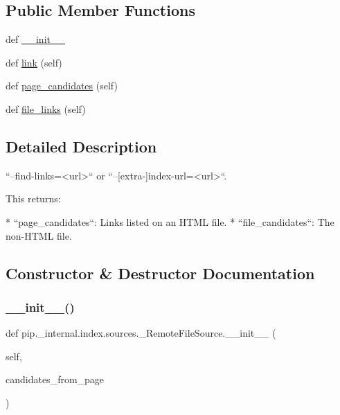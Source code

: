 \subsection*{Public Member Functions}
\begin{DoxyCompactItemize}
\item 
def \hyperlink{classpip_1_1__internal_1_1index_1_1sources_1_1__RemoteFileSource_a6cf0bc50a9928a3990c24a9d6112ecd6}{\+\_\+\+\_\+init\+\_\+\+\_\+}
\item 
def \hyperlink{classpip_1_1__internal_1_1index_1_1sources_1_1__RemoteFileSource_a1010afb9d258203789110068f5df36cd}{link} (self)
\item 
def \hyperlink{classpip_1_1__internal_1_1index_1_1sources_1_1__RemoteFileSource_a52ace3b277ca74b3141195c230a73339}{page\+\_\+candidates} (self)
\item 
def \hyperlink{classpip_1_1__internal_1_1index_1_1sources_1_1__RemoteFileSource_abe92a03e3665143e8a783d40739a63d7}{file\+\_\+links} (self)
\end{DoxyCompactItemize}


\subsection{Detailed Description}
\begin{DoxyVerb}``--find-links=<url>`` or ``--[extra-]index-url=<url>``.

This returns:

* ``page_candidates``: Links listed on an HTML file.
* ``file_candidates``: The non-HTML file.
\end{DoxyVerb}
 

\subsection{Constructor \& Destructor Documentation}
\mbox{\label{classpip_1_1__internal_1_1index_1_1sources_1_1__RemoteFileSource_a6cf0bc50a9928a3990c24a9d6112ecd6}} 
\subsubsection{\texorpdfstring{\+\_\+\+\_\+init\+\_\+\+\_\+()}{\_\_init\_\_()}}
{\footnotesize\ttfamily def pip.\+\_\+internal.\+index.\+sources.\+\_\+\+Remote\+File\+Source.\+\_\+\+\_\+init\+\_\+\+\_\+ (\begin{DoxyParamCaption}\item[{}]{self,  }\item[{}]{candidates\+\_\+from\+\_\+page }\end{DoxyParamCaption})}



